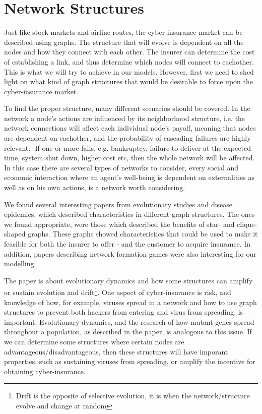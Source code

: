 \section{Network Structures}

Just like stock markets and airline routes, the cyber-insurance market can be described using graphs. The structure that will evolve is dependent on all the nodes and how they connect with each other. The insurer can determine the cost of establishing a link, and thus  determine which nodes will connect to eachother. This is what we will try to achieve in our models. However, first we need to shed light on what kind of graph structures that would be desirable to force upon the cyber-insurance market.

To find the proper structure, many different scenarios should be covered. In the network a node's actions are influenced by its neighborhood structure, i.e. the network connections will affect each individual node's payoff, meaning that nodes are dependent on eachother, and the probability of cascading failures are highly relevant. -If one or more fails, e.g. bankruptcy, failure to deliver at the expected time, system shut down, higher cost etc, then the whole network will be affected. In this case there are several types of networks to consider, every social and economic interaction where an agent's well-being is dependent on externalities as well as on his own actions, is a network worth considering.

We found several interesting papers from evolutionary studies and disease epidemics, which described  characteristics in different graph structures. The ones we found appropriate, were those which described the benefits of star- and clique-shaped graphs. These graphs showed characteristics that could be used to make it feasible for both the insurer to offer - and the customer to acquire insurance. In addition, papers describing network formation games were also interesting for our modelling. 

 The paper \cite{lieberman2005evolutionary} is about evolutionary dynamics and how some structures
can amplify or sustain evolution and drift\footnote{Drift is the opposite of selective evolution, it is when the network/structure evolve and change at random}. One aspect of cyber-insurance is risk, and knowledge of how, for example, viruses spread in a network and how to use graph structures to prevent both hackers from entering and virus from spreading, is important. Evolutionary dynamics, and the research of how mutant genes spread throughout a population, as described in the paper, is analogous to this issue.
If we can determine some structures where certain nodes are advantageous/disadvantageous, then these structures will have imporant  properties, such as sustaining viruses from spreading, or amplify the incentive for obtaining cyber-insurance. 

